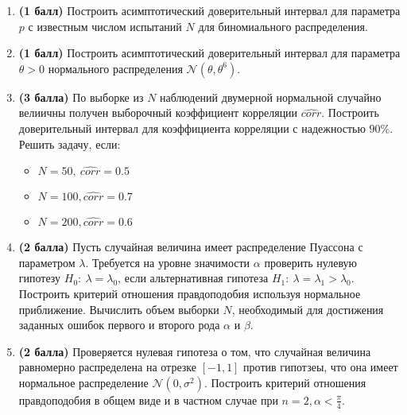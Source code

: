 \documentclass{assignment}
\begin{document}
\begin{enumerate}
    \item \textbf{(1 балл)} Построить асимптотический доверительный интервал для параметра $p$ с известным числом испытаний $N$ для биномиального распределения.

    \item \textbf{(1 балл)} Построить асимптотический доверительный интервал для параметра $\theta > 0$ нормального распределения $\mathcal{N}(\theta, \theta^6)$.


    \item \textbf{(3 балла)} По выборке из $N$ наблюдений двумерной нормальной случайно велиичны получен выборочный коэффициент корреляции $\hat{corr}$. Построить доверительный интервал для коэффициента корреляции с надежностью $90\%$. Решить задачу, если: 

    \begin{itemize}
        \item $N = 50,~ \hat{corr} = 0.5$
        \item $N = 100, \hat{corr} = 0.7$
        \item $N = 200, \hat{corr} = 0.6$

    \end{itemize}


    \item \textbf{(2 балла)} Пусть случайная величина имеет распределение Пуассона с параметром $\lambda$. Требуется на уровне значимости $\alpha$ проверить нулевую гипотезу $H_0:~ \lambda = \lambda_0$, если альтернативная гипотеза $H_1:~ \lambda = \lambda_1 > \lambda_0$. Построить критерий отношения правдоподобия используя нормальное приближение. Вычислить объем выборки $N$, необходимый для достижения заданных ошибок первого и второго рода $\alpha$ и $\beta$.

    \item \textbf{(2 балла)} Проверяется нулевая гипотеза о том, что случайная величина равномерно распределена на отрезке $[-1, 1]$ против гипотзеы, что она имеет нормальное распределение $\mathcal{N}(0, \sigma^2)$. Построить критерий отношения правдоподобия в общем виде и в частном случае при $\displaystyle n = 2, \alpha < \frac{\pi}{4}$.
    


\end{enumerate}
\end{document}
